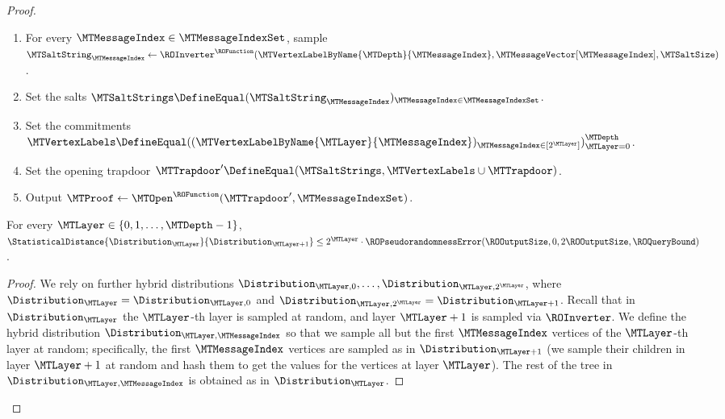\begin{proof}
\begin{itemize}[noitemsep]
\begin{enumerate}[noitemsep]
\begin{enumerate}[noitemsep]
\item Set $\MTVertexLabelByName{\MTLayer-1}{2\MTMessageIndex-1} \DefineEqual \ROQuery_{\LeftSymbol}$.
\item Set $\MTVertexLabelByName{\MTLayer-1}{2\MTMessageIndex} \DefineEqual \ROQuery_{\RightSymbol}$.
\end{enumerate}
\item For every $\MTMessageIndex \in \MTMessageIndexSet$, sample $\MTSaltString_{\MTMessageIndex} \gets \ROInverter^{\ROFunction}(\MTVertexLabelByName{\MTDepth}{\MTMessageIndex},\MTMessageVector[\MTMessageIndex],\MTSaltSize)$.
\item Set the salts $\MTSaltStrings \DefineEqual (\MTSaltString_{\MTMessageIndex})_{\MTMessageIndex \in \MTMessageIndexSet}$.
\item Set the commitments $\MTVertexLabels \DefineEqual ((\MTVertexLabelByName{\MTLayer}{\MTMessageIndex})_{\MTMessageIndex \in [2^{\MTLayer}]})_{\MTLayer=0}^{\MTDepth}$.
\item Set the opening trapdoor $\MTTrapdoor' \DefineEqual (\MTSaltStrings,\MTVertexLabels \cup \MTTrapdoor)$.
\item Output $\MTProof \gets \MTOpen^{\ROFunction}(\MTTrapdoor', \MTMessageIndexSet)$.
\end{enumerate}
\end{itemize}

\begin{claim}
For every $\MTLayer \in \{0,1,\ldots,\MTDepth-1\}$,
$\StatisticalDistance{\Distribution_{\MTLayer}}{\Distribution_{\MTLayer+1}} \leq 2^{\MTLayer} \cdot \ROPseudorandomnessError(\ROOutputSize,0,2\ROOutputSize,\ROQueryBound)$.
\end{claim}

\begin{proof}
We rely on further hybrid distributions $\Distribution_{\MTLayer,0},\ldots,\Distribution_{\MTLayer,2^{\MTLayer}}$, where $\Distribution_{\MTLayer} = \Distribution_{\MTLayer,0}$ and $\Distribution_{\MTLayer,2^{\MTLayer}} = \Distribution_{\MTLayer+1}$. Recall that in $\Distribution_{\MTLayer}$ the $\MTLayer$-th layer is sampled at random, and layer $\MTLayer+1$ is sampled via $\ROInverter$. We define the hybrid distribution $\Distribution_{\MTLayer,\MTMessageIndex}$ so that we sample all but the first $\MTMessageIndex$ vertices of the $\MTLayer$-th layer at random; specifically, the first $\MTMessageIndex$ vertices are sampled as in $\Distribution_{\MTLayer+1}$ (we sample their children in layer $\MTLayer+1$ at random and hash them to get the values for the vertices at layer $\MTLayer$). The rest of the tree in $\Distribution_{\MTLayer,\MTMessageIndex}$ is obtained as in $\Distribution_{\MTLayer}$.


\end{proof}
\end{proof}
